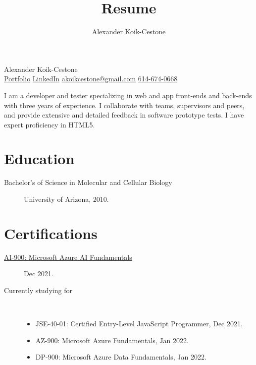 \documentclass{article}
\author{Alexander Koik-Cestone}
\title{Resume}
\begin{document}
\begin{center}
{\huge Alexander Koik-Cestone\vspace{0.3cm}} \\
\href{https://sirkoik.github.io#portfolio}{Portfolio}
\textcolor{gray}{\textbullet}
\href{https://www.linkedin.com/in/alexander-koik-cestone-89304556/}{LinkedIn}
\textcolor{gray}{\textbullet}
\href{mailto:akoikcestone@gmail.com}{akoikcestone@gmail.com}
\textcolor{gray}{\textbullet}
\href{tel:614-674-0668}{614-674-0668} \\
\end{center}

\noindent
I am a developer and tester specializing in web and app front-ends and back-ends with three years of experience. I collaborate with teams, supervisors and peers, and provide extensive and detailed feedback in software prototype tests. I have expert proficiency in HTML5.

\section*{Education}\vspace{-0.5em}
\begin{description}
  \item[Bachelor's of Science in Molecular and Cellular Biology] University of Arizona, 2010.
\end{description}

\vspace{-1em}
\section*{Certifications}\vspace{-0.5em}
\begin{description}
  \item [\href{https://www.credly.com/badges/fa66cf6b-dff5-4f58-9f4e-4b94fc91b7fa/public_url}{AI-900: Microsoft Azure AI Fundamentals}] Dec 2021.
\end{description}

\begin{description}
  \item [Currently studying for] ~
  \begin{itemize}
    \item JSE-40-01: Certified Entry-Level JavaScript Programmer, Dec 2021.
    \item AZ-900: Microsoft Azure Fundamentals, Jan 2022.
    \item DP-900: Microsoft Azure Data Fundamentals, Jan 2022.
  \end{itemize} 
\end{description}
\end{document}
